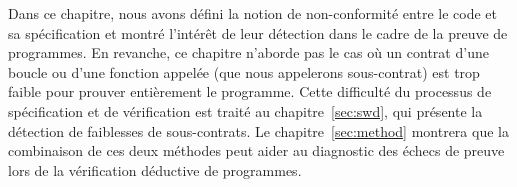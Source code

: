 Dans ce chapitre, nous avons défini la notion de non-conformité entre le code
et sa spécification et montré l'intérêt de leur détection dans le cadre de la
preuve de programmes.
En revanche, ce chapitre n'aborde pas le cas où un contrat d'une boucle ou
d'une fonction appelée (que nous appelerons sous-contrat) est trop faible pour
prouver entièrement le programme.
Cette difficulté du processus de spécification et de vérification est traité au
chapitre~\ref{sec:swd}, qui présente la détection de faiblesses de
sous-contrats.
Le chapitre~\ref{sec:method} montrera que la combinaison de ces deux méthodes
peut aider au diagnostic des échecs de preuve lors de la vérification déductive
de programmes.
